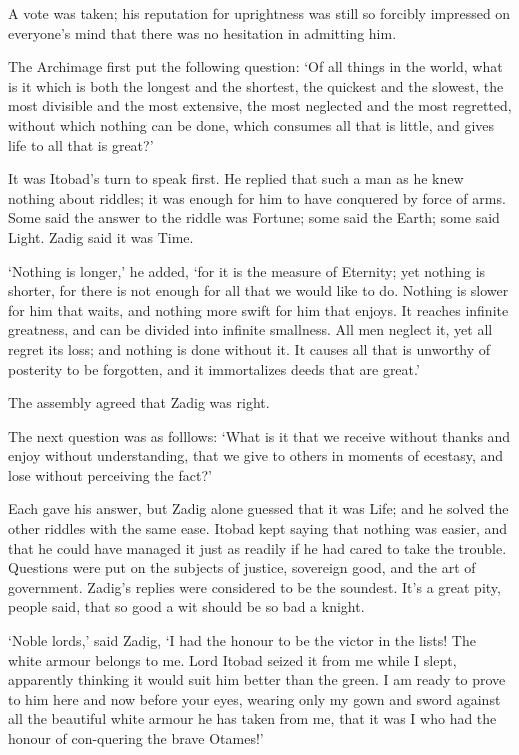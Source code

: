 \documentclass{article}
\begin{document}
\begin{center}
A vote was taken; his reputation for uprightness was still so forcibly impressed 
on everyone's mind that there was no hesitation in admitting him. 

The Archimage first put the following question: `Of all things in the world, what 
is it which is both the longest and the shortest, the quickest and the slowest, 
the most divisible and the most extensive, the most neglected and the most regretted, 
without which nothing can be done, which consumes all that is little, and gives 
life to all that is great?' 

It was Itobad's turn to speak first. He replied that such a man as he knew nothing 
about riddles; it was enough for him to have conquered by force of arms. Some said 
the answer to the riddle was Fortune; some said the Earth; some said Light. Zadig 
said it was Time. 

`Nothing is longer,' he added, `for it is the measure of Eternity; yet nothing 
is shorter, for there is not enough for all that we would like to do. Nothing is 
slower for him that waits, and nothing more swift for him that enjoys. It reaches 
infinite greatness, and can be divided into infinite smallness. All men neglect 
it, yet all regret its loss; and nothing is done without it. It causes all that 
is unworthy of posterity to be forgotten, and it immortalizes deeds that are great.' 

The assembly agreed that Zadig was right. 

The next question was as folllows: `What is it that we receive without thanks and 
enjoy without understanding, that we give to others in moments of ecestasy, and 
lose without perceiving the fact?' 

Each gave his answer, but Zadig alone guessed that it was Life; and he solved the 
other riddles with the same ease. Itobad kept saying that nothing was easier, and 
that he could have managed it just as readily if he had cared to take the trouble. 
Questions were put on the subjects of justice, sovereign good, and the art of government. 
Zadig's replies were considered to be the soundest. It's a great pity, people said, 
that so good a wit should be so bad a knight. 

`Noble lords,' said Zadig, `I had the honour to be the victor in the lists! The 
white armour belongs to me. Lord Itobad seized it from me while I slept, apparently 
thinking it would suit him better than the green. I am ready to prove to him here 
and now before your eyes, wearing only my gown and sword against all the beautiful 
white armour he has taken from me, that it was I who had the honour of con-quering 
the brave Otames!' 


\end{center}
\end{document}
